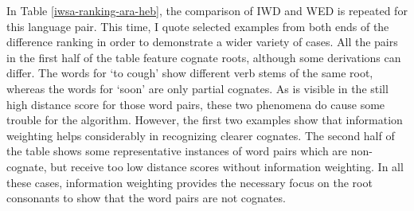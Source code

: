 In Table \ref{iwsa-ranking-ara-heb}, the comparison of IWD and WED is repeated for this language pair. This time, I quote selected examples from both ends of the difference ranking in order to demonstrate a wider variety of cases. All the pairs in the first half of the table feature cognate roots, although some derivations can differ. The words for `to cough' show different verb stems of the same root, whereas the words for `soon' are only partial cognates. As is visible in the still high distance score for those word pairs, these two phenomena do cause some trouble for the algorithm. However, the first two examples show that information weighting helps considerably in recognizing clearer cognates. The second half of the table shows some representative instances of word pairs which are non-cognate, but receive too low distance scores without information weighting. In all these cases, information weighting provides the necessary focus on the root consonants to show that the word pairs are not cognates.


\begin{table}
\centering
{}
\caption{Comparison of normalized weighted string distances on Arabic and Hebrew}
\label{iwsa-ranking-ara-heb}
\end{table}

